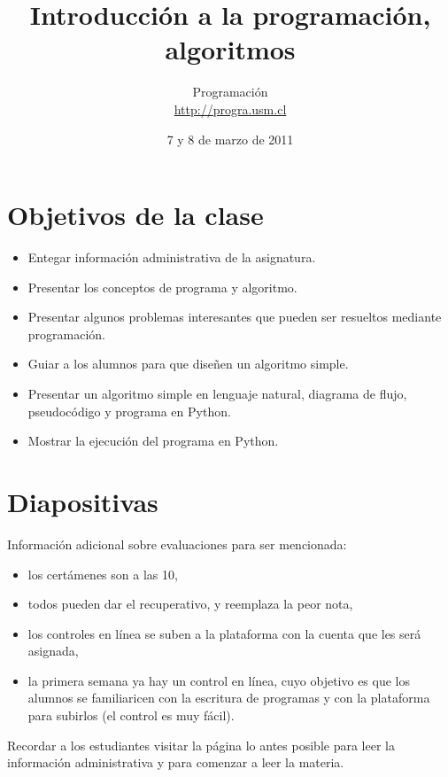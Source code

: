 \documentclass[10pt]{article}
\title{Introducción a la programación, algoritmos}
\author{Programación \\ \url{http://progra.usm.cl}}
\date{7 y 8 de marzo de 2011}
\begin{document}
  \maketitle

  \section*{Objetivos de la clase}
  \begin{itemize}
    \item Entegar información administrativa de la asignatura.
    \item Presentar los conceptos de programa y algoritmo.
    \item Presentar algunos problemas interesantes
      que pueden ser resueltos mediante programación.
    \item Guiar a los alumnos para que diseñen un algoritmo simple.
    \item Presentar un algoritmo simple en lenguaje natural,
      diagrama de flujo, pseudocódigo y programa en Python.
    \item Mostrar la ejecución del programa en Python.
  \end{itemize}

  \section*{Diapositivas}


  Información adicional sobre evaluaciones
  para ser mencionada:
  \begin{itemize}
    \item los certámenes son a las 10,
    \item todos pueden dar el recuperativo,
      y reemplaza la peor nota,
    \item los controles en línea
      se suben a la plataforma con la cuenta que les será asignada,
    \item la primera semana ya hay un control en línea,
      cuyo objetivo es que los alumnos se familiaricen
      con la escritura de programas
      y con la plataforma para subirlos
      (el control es muy fácil).
  \end{itemize}


  Recordar a los estudiantes
  visitar la página lo antes posible
  para leer la información administrativa
  y para comenzar a leer la materia.
  
\end{document}
